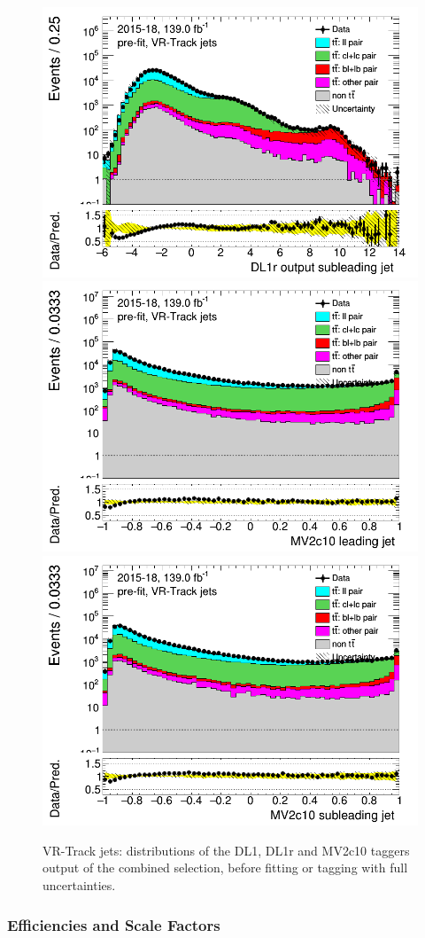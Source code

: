 \documentclass[letterpaper,12pt]{article}
\begin{document}
\begin{figure}[H]
	\includegraphics[width=.45\textwidth]{FTAG_plots/pretagNoRwwithhighpTVRJetsall/DataMC_h_J1_DL1rtrackjet_log.png}\\
	\includegraphics[width=.45\textwidth]{FTAG_plots/pretagNoRwwithhighpTVRJetsall/DataMC_h_J0_MV2c10_Fulltrackjet_log.png}
	\includegraphics[width=.45\textwidth]{FTAG_plots/pretagNoRwwithhighpTVRJetsall/DataMC_h_J1_MV2c10_Fulltrackjet_log.png}\\
	\caption{VR-Track jets: distributions of the DL1, DL1r and MV2c10 taggers output of 
	the combined selection, 
	before fitting or tagging with full uncertainties.} \label{fig:taggers_VRJets}
\end{figure}	

\subsubsection{Efficiencies and Scale Factors}
\end{document}
